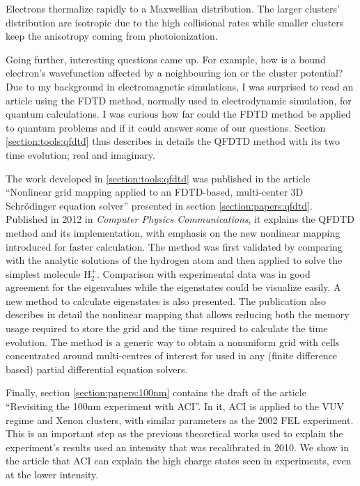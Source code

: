 Electrons thermalize rapidly to a Maxwellian distribution. The larger clusters'
distribution are isotropic due to the high collisional rates while smaller
clusters keep the anisotropy coming from photoionization.




Going further, interesting questions came up. For example, how is a bound
electron's wavefunction affected by a neighbouring ion or the cluster potential?
Due to my background in electromagnetic simulations, I was surprised to read
an article using the FDTD method, normally used in electrodynamic simulation,
for quantum calculations. I was curious how far could the FDTD method be
applied to quantum problems and if it could answer some of our questions.
Section \ref{section:tools:qfdtd} thus describes in details the QFDTD method
with its two time evolution; real and imaginary.

The work developed in \ref{section:tools:qfdtd} was published in the article
``Nonlinear grid mapping applied to an FDTD-based, multi-center 3D
Schr\"odinger equation solver'' presented in section \ref{section:papers:qfdtd}.
Published in 2012 in \textit{Computer Physics Communications}, it
explains the QFDTD method and its implementation, with emphasis on the new
nonlinear mapping introduced for faster calculation.
The method was first validated by comparing with the analytic solutions of
the hydrogen atom and then applied to solve the simplest molecule H$_{2}^{+}$.
Comparison with experimental data was in good agreement for the eigenvalues
while the eigenstates could be visualize easily. A new method to calculate
eigenstates is also presented. The publication also
describes in detail the nonlinear mapping that allows reducing both the memory
usage required to store the grid and the time required to calculate the time
evolution. The method is a generic way to obtain a nonuniform grid with cells
concentrated around multi-centres of interest for used in any (finite difference
based) partial differential equation solvers.

Finally, section \ref{section:papers:100nm} contains the draft of the article
``Revisiting the 100nm experiment with ACI''. In it, ACI is
applied to the VUV regime and Xenon clusters, with similar parameters as the 2002
FEL experiment. This is an important step as the previous theoretical works
used to explain the experiment's results used an intensity that was
recalibrated in 2010. We show in the article that ACI can explain the high
charge states seen in experiments, even at the lower intensity.





